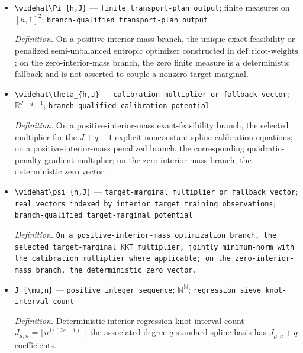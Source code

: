 \documentclass{article}
\begin{document}
\begin{itemize}
  \item \texttt{\textbackslash{}\allowbreak{}widehat\textbackslash{}\allowbreak{}Pi\_\allowbreak{}\{h,\allowbreak{}J\}\allowbreak{}} --- \texttt{finite transport-\allowbreak{}plan output}; finite measures on \([h,1]^2\); \texttt{branch-\allowbreak{}qualified transport-\allowbreak{}plan output}
  \par\smallskip\noindent\emph{Definition.} On a positive-interior-mass branch, the unique exact-feasibility or penalized semi-unbalanced entropic optimizer constructed in \(\mathrm{def:ricot\text{-}weights}\); on the zero-interior-mass branch, the zero finite measure is a deterministic fallback and is not asserted to couple a nonzero target marginal.
  \item \texttt{\textbackslash{}\allowbreak{}widehat\textbackslash{}\allowbreak{}theta\_\allowbreak{}\{h,\allowbreak{}J\}\allowbreak{}} --- \texttt{calibration multiplier or fallback vector}; \(\mathbb R^{J+q-1}\); \texttt{branch-\allowbreak{}qualified calibration potential}
  \par\smallskip\noindent\emph{Definition.} On a positive-interior-mass exact-feasibility branch, the selected multiplier for the \(J+q-1\) explicit nonconstant spline-calibration equations; on a positive-interior-mass penalized branch, the corresponding quadratic-penalty gradient multiplier; on the zero-interior-mass branch, the deterministic zero vector.
  \item \texttt{\textbackslash{}\allowbreak{}widehat\textbackslash{}\allowbreak{}psi\_\allowbreak{}\{h,\allowbreak{}J\}\allowbreak{}} --- \texttt{target-\allowbreak{}marginal multiplier or fallback vector}; \texttt{real vectors indexed by interior target training observations}; \texttt{branch-\allowbreak{}qualified target-\allowbreak{}marginal potential}
  \par\smallskip\noindent\emph{Definition.} \texttt{On a positive-\allowbreak{}interior-\allowbreak{}mass optimization branch,\allowbreak{} the selected target-\allowbreak{}marginal KKT multiplier,\allowbreak{} jointly minimum-\allowbreak{}norm with the calibration multiplier where applicable;\allowbreak{} on the zero-\allowbreak{}interior-\allowbreak{}mass branch,\allowbreak{} the deterministic zero vector.}
  \item \texttt{J\_\allowbreak{}\{\textbackslash{}\allowbreak{}mu,\allowbreak{}n\}\allowbreak{}} --- \texttt{positive integer sequence}; \(\mathbb N^\mathbb N\); \texttt{regression sieve knot-\allowbreak{}interval count}
  \par\smallskip\noindent\emph{Definition.} Deterministic interior regression knot-interval count \(J_{\mu,n}=\lceil n^{1/(2s+1)}\rceil\); the associated degree-\(q\) standard spline basis has \(J_{\mu,n}+q\) coefficients.

\end{itemize}
\end{document}
